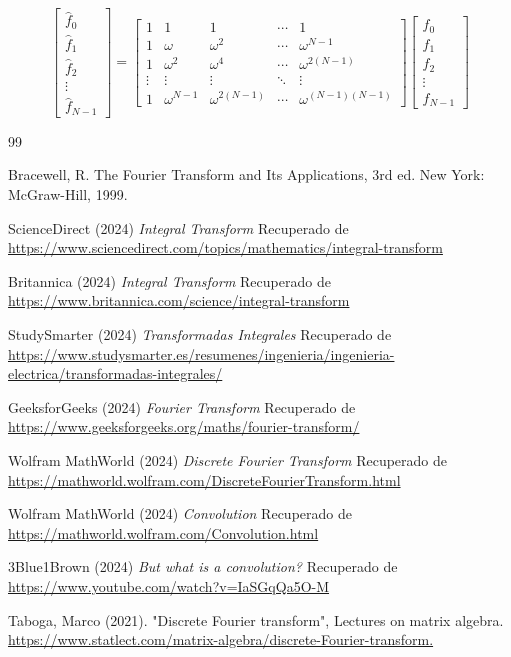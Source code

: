 \documentclass[12pt]{article}
\begin{document}
$$\boxed{
\begin{bmatrix}
\hat{f}_0 \\
\hat{f}_1 \\
\hat{f}_2 \\
\vdots \\
\hat{f}_{N-1}
\end{bmatrix}
=
\begin{bmatrix}
1 & 1 & 1 & \cdots & 1 \\
1 & \omega & \omega^2 & \cdots & \omega^{N-1} \\
1 & \omega^2 & \omega^4 & \cdots & \omega^{2(N-1)} \\
\vdots & \vdots & \vdots & \ddots & \vdots \\
1 & \omega^{N-1} & \omega^{2(N-1)} & \cdots & \omega^{(N-1)(N-1)}
\end{bmatrix}
\begin{bmatrix}
f_0 \\
f_1 \\
f_2 \\
\vdots \\
f_{N-1}
\end{bmatrix}}
$$


\begin{thebibliography}{99}

Bracewell, R. The Fourier Transform and Its Applications, 3rd ed. New York: McGraw-Hill, 1999.

ScienceDirect (2024) \textit{Integral Transform}
Recuperado de \url{https://www.sciencedirect.com/topics/mathematics/integral-transform}

Britannica (2024) \textit{Integral Transform}
Recuperado de \url{https://www.britannica.com/science/integral-transform}

StudySmarter (2024) \textit{Transformadas Integrales}
Recuperado de \url{https://www.studysmarter.es/resumenes/ingenieria/ingenieria-electrica/transformadas-integrales/}

GeeksforGeeks (2024) \textit{Fourier Transform}
Recuperado de \url{https://www.geeksforgeeks.org/maths/fourier-transform/}

Wolfram MathWorld (2024) \textit{Discrete Fourier Transform}
Recuperado de \url{https://mathworld.wolfram.com/DiscreteFourierTransform.html}

Wolfram MathWorld (2024) \textit{Convolution}
Recuperado de \url{https://mathworld.wolfram.com/Convolution.html}

3Blue1Brown (2024) \textit{But what is a convolution?}
Recuperado de \url{https://www.youtube.com/watch?v=IaSGqQa5O-M}

Taboga, Marco (2021). "Discrete Fourier transform", Lectures on matrix algebra. \url{https://www.statlect.com/matrix-algebra/discrete-Fourier-transform.}

 


\end{thebibliography}
\end{document}
